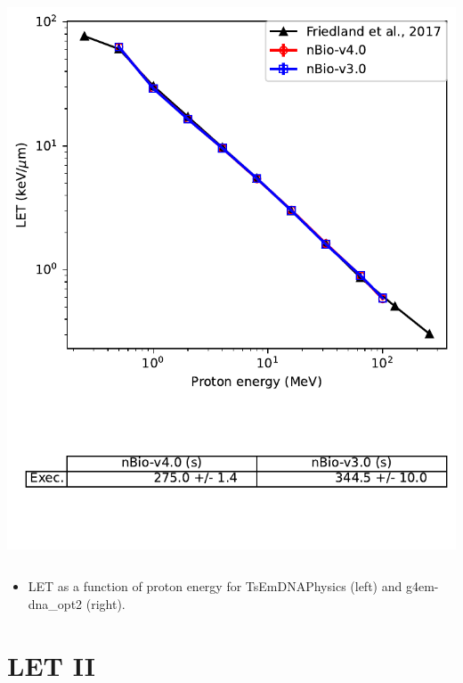 \documentclass[aspectratio=1610]{beamer}
\begin{document}
\begin{frame}{\secname}
\begin{columns}
\begin{column}{0.4\linewidth}
     \includegraphics[width=\textwidth]{./LET/LET_g4em-dna_opt2}
    \end{column}
   \end{columns}
\begin{itemize}
\item \tiny{LET as a function of proton energy for TsEmDNAPhysics (left) and g4em-dna\_opt2 (right).}
\end{itemize}
\end{frame}

\section{LET II}
\end{document}
